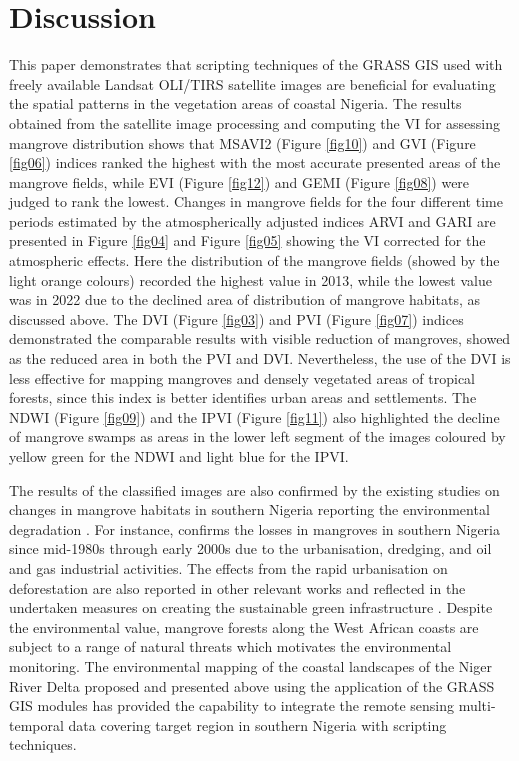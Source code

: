 \documentclass[jmse,article,submit,pdftex,moreauthors]{Definitions/mdpi}
\begin{document}
\section{Discussion}

This paper demonstrates that scripting techniques of the GRASS GIS used with freely available Landsat OLI/TIRS satellite images are beneficial for evaluating the spatial patterns in the vegetation areas of coastal Nigeria. The results obtained from the satellite image processing and computing the VI for assessing mangrove distribution shows that MSAVI2 (Figure \ref{fig10}) and GVI (Figure \ref{fig06}) indices ranked the highest with the most accurate presented areas of the mangrove fields, while EVI (Figure \ref{fig12}) and GEMI (Figure \ref{fig08}) were judged to rank the lowest. Changes in mangrove fields for the four different time periods estimated by the atmospherically adjusted indices ARVI and GARI are presented in Figure \ref{fig04} and Figure \ref{fig05} showing the VI corrected for the atmospheric effects. Here the distribution of the mangrove fields (showed by the light orange colours) recorded the highest value in 2013, while the lowest value was in 2022 due to the declined area of distribution of mangrove habitats, as discussed above. The DVI (Figure \ref{fig03}) and PVI (Figure \ref{fig07}) indices demonstrated the comparable results with visible reduction of mangroves, showed as the reduced area in both the PVI and DVI. Nevertheless, the use of the DVI is less effective for mapping mangroves and densely vegetated areas of tropical forests, since this index is better identifies urban areas and settlements. The NDWI (Figure \ref{fig09}) and the IPVI (Figure \ref{fig11}) also highlighted the decline of mangrove swamps as areas in the lower left segment of the images coloured by yellow green for the NDWI and light blue for the IPVI.

The results of the classified images are also confirmed by the existing studies on changes in mangrove habitats in southern Nigeria reporting the environmental degradation \cite{BAMIDELE2023103274,TOBORE2022158}. For instance, \cite{Godstime2007} confirms the losses in mangroves in southern Nigeria since mid-1980s through early 2000s due to the urbanisation, dredging, and oil and gas industrial activities. The effects from the rapid urbanisation on deforestation are also reported in other relevant works \cite{AyanladeDrake,su141811289} and reflected in the undertaken measures on creating the sustainable green infrastructure \cite{ADEGUN2021e01044}. Despite the environmental value, mangrove forests along the West African coasts are subject to a range of natural threats which motivates the environmental monitoring. The environmental mapping of the coastal landscapes of the Niger River Delta proposed and presented above using the application of the GRASS GIS modules has provided the capability to integrate the remote sensing multi-temporal data covering target region in southern Nigeria with scripting techniques. 
\end{document}
